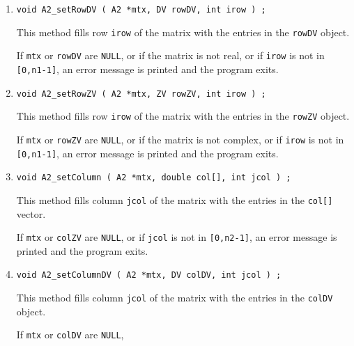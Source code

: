 \begin{enumerate}
or if {\tt irow} is not in {\tt [0,n1-1]},
an error message is printed and the program exits.
\item
\begin{verbatim}
void A2_setRowDV ( A2 *mtx, DV rowDV, int irow ) ;
\end{verbatim}
This method fills row {\tt irow} of the matrix 
with the entries in the {\tt rowDV} object.
\par {}
If {\tt mtx} or {\tt rowDV} are {\tt NULL},
or if the matrix is not real,
or if {\tt irow} is not in {\tt [0,n1-1]},
an error message is printed and the program exits.
\item
\begin{verbatim}
void A2_setRowZV ( A2 *mtx, ZV rowZV, int irow ) ;
\end{verbatim}
This method fills row {\tt irow} of the matrix 
with the entries in the {\tt rowZV} object.
\par {}
If {\tt mtx} or {\tt rowZV} are {\tt NULL},
or if the matrix is not complex,
or if {\tt irow} is not in {\tt [0,n1-1]},
an error message is printed and the program exits.
\item
\begin{verbatim}
void A2_setColumn ( A2 *mtx, double col[], int jcol ) ;
\end{verbatim}
This method fills column {\tt jcol} of the matrix with
the entries in the {\tt col[]} vector.
\par {}
If {\tt mtx} or {\tt colZV} are {\tt NULL},
or if {\tt jcol} is not in {\tt [0,n2-1]},
an error message is printed and the program exits.
\item
\begin{verbatim}
void A2_setColumnDV ( A2 *mtx, DV colDV, int jcol ) ;
\end{verbatim}
This method fills column {\tt jcol} of the matrix with
the entries in the {\tt colDV} object.
\par {}
If {\tt mtx} or {\tt colDV} are {\tt NULL},

\end{enumerate}
